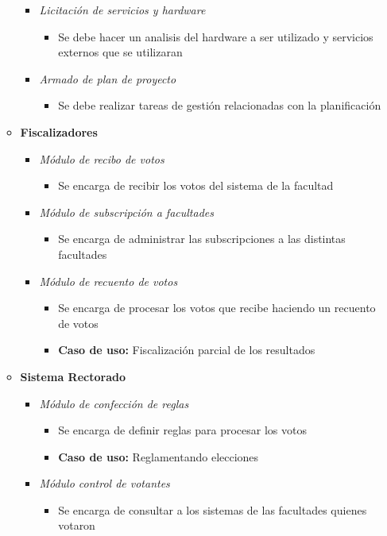 \begin{itemize}
\begin{itemize}
\begin{itemize}
 \item \emph{Licitación de servicios y hardware}
\begin{itemize}
 \item Se debe hacer un analisis del hardware a ser utilizado y servicios externos que se utilizaran
\end{itemize}
 \item \emph{Armado de plan de proyecto}
\begin{itemize}
 \item Se debe realizar tareas de gestión relacionadas con la planificación
\end{itemize}
\end{itemize}
 \item {\bf Fiscalizadores}
\begin{itemize}
 \item \emph{M\'odulo de recibo de votos}
\begin{itemize}
 \item Se encarga de recibir los votos del sistema de la facultad
\end{itemize}
 \item \emph{M\'odulo de subscripción a facultades}
\begin{itemize}
 \item Se encarga de administrar las subscripciones a las distintas facultades
\end{itemize}
 \item \emph{M\'odulo de recuento de votos}
\begin{itemize}
 \item Se encarga de procesar los votos que recibe haciendo un recuento de votos
 \item {\bf Caso de uso:} Fiscalización parcial de los resultados
\end{itemize}
\end{itemize}
 \item {\bf Sistema Rectorado}
\begin{itemize}
 \item \emph{M\'odulo de confección de reglas}
\begin{itemize}
 \item Se encarga de definir reglas para procesar los votos
 \item {\bf Caso de uso:} Reglamentando elecciones
\end{itemize}
 \item \emph{M\'odulo control de votantes}
\begin{itemize}
 \item Se encarga de consultar a los sistemas de las facultades quienes votaron

\end{itemize}
\end{itemize}
\end{itemize}
\end{itemize}
